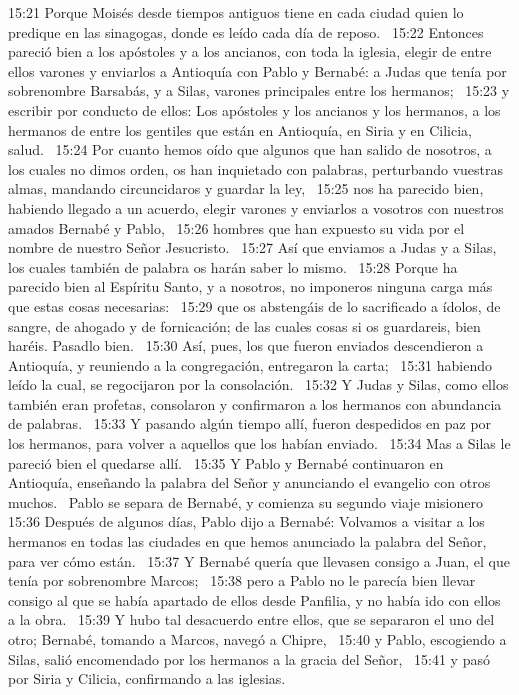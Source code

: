 15:21 Porque Moisés desde tiempos antiguos tiene en cada ciudad quien lo predique en las sinagogas, donde es leído cada día de reposo.  
15:22 Entonces pareció bien a los apóstoles y a los ancianos, con toda la iglesia, elegir de entre ellos varones y enviarlos a Antioquía con Pablo y Bernabé: a Judas que tenía por sobrenombre Barsabás, y a Silas, varones principales entre los hermanos;  
15:23 y escribir por conducto de ellos: Los apóstoles y los ancianos y los hermanos, a los hermanos de entre los gentiles que están en Antioquía, en Siria y en Cilicia, salud.  
15:24 Por cuanto hemos oído que algunos que han salido de nosotros, a los cuales no dimos orden, os han inquietado con palabras, perturbando vuestras almas, mandando circuncidaros y guardar la ley,  
15:25 nos ha parecido bien, habiendo llegado a un acuerdo, elegir varones y enviarlos a vosotros con nuestros amados Bernabé y Pablo,  
15:26 hombres que han expuesto su vida por el nombre de nuestro Señor Jesucristo.  
15:27 Así que enviamos a Judas y a Silas, los cuales también de palabra os harán saber lo mismo.  
15:28 Porque ha parecido bien al Espíritu Santo, y a nosotros, no imponeros ninguna carga más que estas cosas necesarias:  
15:29 que os abstengáis de lo sacrificado a ídolos, de sangre, de ahogado y de fornicación; de las cuales cosas si os guardareis, bien haréis. Pasadlo bien.  
15:30 Así, pues, los que fueron enviados descendieron a Antioquía, y reuniendo a la congregación, entregaron la carta;  
15:31 habiendo leído la cual, se regocijaron por la consolación.  
15:32 Y Judas y Silas, como ellos también eran profetas, consolaron y confirmaron a los hermanos con abundancia de palabras.  
15:33 Y pasando algún tiempo allí, fueron despedidos en paz por los hermanos, para volver a aquellos que los habían enviado.  
15:34 Mas a Silas le pareció bien el quedarse allí.  
15:35 Y Pablo y Bernabé continuaron en Antioquía, enseñando la palabra del Señor y anunciando el evangelio con otros muchos.  
Pablo se separa de Bernabé, y comienza su segundo viaje misionero  
15:36 Después de algunos días, Pablo dijo a Bernabé: Volvamos a visitar a los hermanos en todas las ciudades en que hemos anunciado la palabra del Señor, para ver cómo están.  
15:37 Y Bernabé quería que llevasen consigo a Juan, el que tenía por sobrenombre Marcos;  
15:38 pero a Pablo no le parecía bien llevar consigo al que se había apartado de ellos desde Panfilia, y no había ido con ellos a la obra.  
15:39 Y hubo tal desacuerdo entre ellos, que se separaron el uno del otro; Bernabé, tomando a Marcos, navegó a Chipre,  
15:40 y Pablo, escogiendo a Silas, salió encomendado por los hermanos a la gracia del Señor,  
15:41 y pasó por Siria y Cilicia, confirmando a las iglesias.  
